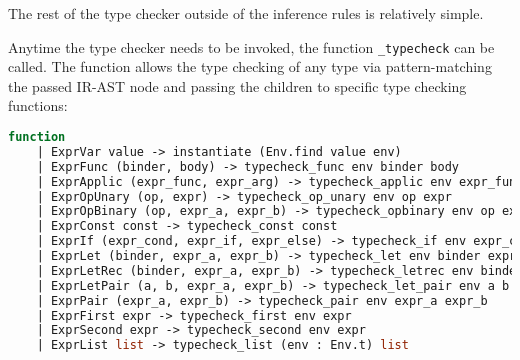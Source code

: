 \documentclass{l4proj}
\begin{document}
The rest of the type checker outside of the inference rules is relatively simple.

Anytime the type checker needs to be invoked, the function \texttt{\_typecheck} can be called.
The function allows the type checking of any type via pattern-matching the passed IR-AST node and passing the children to specific type checking functions:

\begin{lstlisting}[language=Caml, caption=The body of PyFunc's main type check function\, which defers to other more specific type checking functions via patter-matching.]
function
    | ExprVar value -> instantiate (Env.find value env)
    | ExprFunc (binder, body) -> typecheck_func env binder body
    | ExprApplic (expr_func, expr_arg) -> typecheck_applic env expr_func expr_arg
    | ExprOpUnary (op, expr) -> typecheck_op_unary env op expr
    | ExprOpBinary (op, expr_a, expr_b) -> typecheck_opbinary env op expr_a expr_b
    | ExprConst const -> typecheck_const const
    | ExprIf (expr_cond, expr_if, expr_else) -> typecheck_if env expr_cond expr_if expr_else
    | ExprLet (binder, expr_a, expr_b) -> typecheck_let env binder expr_a expr_b
    | ExprLetRec (binder, expr_a, expr_b) -> typecheck_letrec env binder expr_a expr_b
    | ExprLetPair (a, b, expr_a, expr_b) -> typecheck_let_pair env a b expr_a expr_b
    | ExprPair (expr_a, expr_b) -> typecheck_pair env expr_a expr_b
    | ExprFirst expr -> typecheck_first env expr
    | ExprSecond expr -> typecheck_second env expr
    | ExprList list -> typecheck_list (env : Env.t) list
\end{lstlisting}
\end{document}
